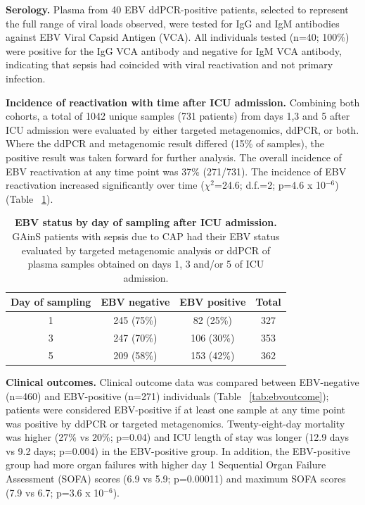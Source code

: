 \textbf{Serology.}
Plasma from 40 EBV ddPCR-positive patients, selected to represent the full range of viral loads observed, were tested for IgG and IgM antibodies against EBV Viral Capsid Antigen (VCA). All individuals tested (n=40; 100\%) were positive for the IgG VCA antibody and negative for IgM VCA antibody, indicating that sepsis had coincided with viral reactivation and not primary infection.

\textbf{Incidence of reactivation with time after ICU admission.}
Combining both cohorts, a total of 1042 unique samples (731 patients) from days 1,3 and 5 after ICU admission were evaluated by either targeted metagenomics, ddPCR, or both. Where the ddPCR and metagenomic result differed (15\% of samples), the positive result was taken forward for further analysis. The overall incidence of EBV reactivation at any time point was 37\% (271/731). The incidence of EBV reactivation increased significantly over time ($\chi^2$=24.6; d.f.=2; p=4.6 x 10$^{-6}$) (Table ~\ref{tab:ebvincidence}).

\FloatBarrier
\begin{table}[]
\begin{center}
\begin{tabular}{|c|c|c|c|}
\hline
\textbf{Day of sampling} & \textbf{EBV negative} & \textbf{EBV positive} & \textbf{Total} \\ \hline
1                        & 245 (75\%)            & 82 (25\%)             & 327            \\ \hline
3                        & 247 (70\%)            & 106 (30\%)            & 353            \\ \hline
5                        & 209 (58\%)            & 153 (42\%)            & 362            \\ \hline
\end{tabular}
\end{center}
\smallskip
\caption[EBV status by day of sampling]{\textbf{EBV status by day of sampling after ICU admission.} GAinS patients with sepsis due to CAP had their EBV status evaluated by targeted metagenomic analysis or ddPCR of plasma samples obtained on days 1, 3 and/or 5 of ICU admission.}
\label{tab:ebvincidence}
\end{table}

\textbf{Clinical outcomes.}
Clinical outcome data was compared between EBV-negative (n=460) and EBV-positive (n=271) individuals (Table ~\ref{tab:ebvoutcome}); patients were considered EBV-positive if at least one sample at any time point was positive by ddPCR or targeted metagenomics. Twenty-eight-day mortality was higher (27\% vs 20\%; p=0.04) and ICU length of stay was longer (12.9 days vs 9.2 days; p=0.004) in the EBV-positive group. In addition, the EBV-positive group had more organ failures with higher day 1 Sequential Organ Failure Assessment (SOFA) scores (6.9 vs 5.9; p=0.00011) and maximum SOFA scores (7.9 vs 6.7; p=3.6 x 10$^{-6}$).

